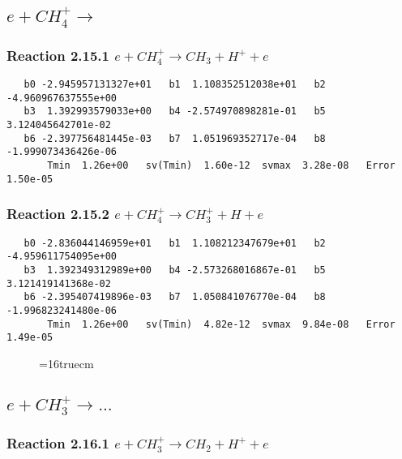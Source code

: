 \documentclass[12pt]{article}
\begin{document}
\subsection{ 
$e + CH_4^+ \rightarrow $
}

\subsubsection{
Reaction 2.15.1    $e + CH_4^+ \rightarrow CH_3 + H^+ + e$
}

\begin{small}\begin{verbatim} 
   b0 -2.945957131327e+01   b1  1.108352512038e+01   b2 -4.960967637555e+00
   b3  1.392993579033e+00   b4 -2.574970898281e-01   b5  3.124045642701e-02
   b6 -2.397756481445e-03   b7  1.051969352717e-04   b8 -1.999073436426e-06
       Tmin  1.26e+00   sv(Tmin)  1.60e-12  svmax  3.28e-08   Error  1.50e-05
\end{verbatim}\end{small}

\subsubsection{
Reaction 2.15.2    $e + CH_4^+ \rightarrow CH_3^+ + H + e$
}

\begin{small}\begin{verbatim} 
   b0 -2.836044146959e+01   b1  1.108212347679e+01   b2 -4.959611754095e+00
   b3  1.392349312989e+00   b4 -2.573268016867e-01   b5  3.121419141368e-02
   b6 -2.395407419896e-03   b7  1.050841076770e-04   b8 -1.996823241480e-06
       Tmin  1.26e+00   sv(Tmin)  4.82e-12  svmax  9.84e-08   Error  1.49e-05
\end{verbatim}\end{small}

\begin{figure} \label{met.2_2.15}
\epsfxsize=16truecm
\end{figure}
\newpage
 
\subsection{ 
$e + CH_3^+ \rightarrow ... $
}
 
\subsubsection{
Reaction 2.16.1   $e + CH_3^+ \rightarrow CH_2 + H^+ + e$
}
\end{document}
